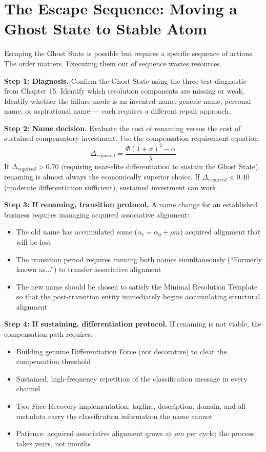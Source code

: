 \documentclass[12pt, openany]{book}
\theoremstyle{thmstyle}
\theoremstyle{defstyle}
\begin{document}
\section{The Escape Sequence: Moving a Ghost State to Stable Atom}

Escaping the Ghost State is possible but requires a specific sequence of actions. The order matters. Executing them out of sequence wastes resources.

\textbf{Step 1: Diagnosis.} Confirm the Ghost State using the three-test diagnostic from Chapter 15. Identify which resolution components are missing or weak. Identify whether the failure mode is an invented name, generic name, personal name, or aspirational name --- each requires a different repair approach.

\textbf{Step 2: Name decision.} Evaluate the cost of renaming versus the cost of sustained compensatory investment. Use the compensation requirement equation:
\[
\Delta_{required} = \frac{\Phi(1+\sigma)^2 - \alpha}{\lambda}
\]
If $\Delta_{required} > 0.70$ (requiring near-elite differentiation to sustain the Ghost State), renaming is almost always the economically superior choice. If $\Delta_{required} < 0.40$ (moderate differentiation sufficient), sustained investment can work.

\textbf{Step 3: If renaming, transition protocol.} A name change for an established business requires managing acquired associative alignment:
\begin{itemize}[leftmargin=1.5em]
  \item The old name has accumulated some ($\alpha_t = \alpha_0 + \rho m$) acquired alignment that will be lost
  \item The transition period requires running both names simultaneously (``Formerly known as...'') to transfer associative alignment
  \item The new name should be chosen to satisfy the Minimal Resolution Template so that the post-transition entity immediately begins accumulating structural alignment
\end{itemize}

\textbf{Step 4: If sustaining, differentiation protocol.} If renaming is not viable, the compensation path requires:
\begin{itemize}[leftmargin=1.5em]
  \item Building genuine Differentiation Force (not decorative) to clear the compensation threshold
  \item Sustained, high-frequency repetition of the classification message in every channel
  \item Two-Face Recovery implementation: tagline, description, domain, and all metadata carry the classification information the name cannot
  \item Patience: acquired associative alignment grows at $\rho m$ per cycle; the process takes years, not months
\end{itemize}
\end{document}
